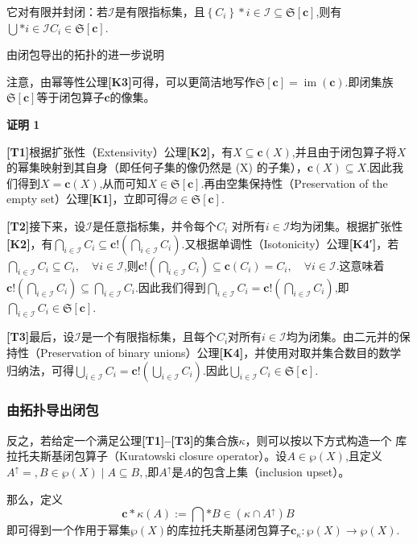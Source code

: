 它对有限并封闭：若$\mathcal{I}$是有限指标集，且$\left\{ C_i \right\}*{i \in \mathcal{I}} \subseteq {\mathfrak{S}}[\mathbf{c}]$,则有$\bigcup*{i \in \mathcal{I}} C_i \in {\mathfrak{S}}[\mathbf{c}]$.

由闭包导出的拓扑的进一步说明

注意，由幂等性公理\textbf{[K3]}可得，可以更简洁地写作${\mathfrak{S}}[\mathbf{c}] = \operatorname{im}(\mathbf{c})$.即闭集族${\mathfrak{S}}[\mathbf{c}]$等于闭包算子$\mathbf{c}$的像集。

\textbf{证明 1}

\textbf{[T1]}根据扩张性（Extensivity）公理\textbf{[K2]}，有$X \subseteq \mathbf{c}(X)$,并且由于闭包算子将$X$的幂集映射到其自身（即任何子集的像仍然是 (X) 的子集），$\mathbf{c}(X) \subseteq X$.因此我们得到$X = \mathbf{c}(X)$,从而可知$X \in {\mathfrak{S}}[\mathbf{c}]$.再由空集保持性（Preservation of the empty set）公理\textbf{[K1]}，立即可得$\varnothing \in {\mathfrak{S}}[\mathbf{c}]$.

\textbf{[T2]}接下来，设$\mathcal{I}$是任意指标集，并令每个$C_i$ 对所有$i \in \mathcal{I}$均为闭集。根据扩张性\textbf{[K2]}，有$\bigcap_{i \in \mathcal{I}} C_i \subseteq \mathbf{c}!\left( \bigcap_{i \in \mathcal{I}} C_i \right)$.又根据单调性（Isotonicity）公理\textbf{[K4′]}，若$\bigcap_{i \in \mathcal{I}} C_i \subseteq C_i, \quad \forall i \in \mathcal{I}$,则$\mathbf{c}!\left( \bigcap_{i \in \mathcal{I}} C_i \right) \subseteq \mathbf{c}(C_i) = C_i, \quad \forall i \in \mathcal{I}$.这意味着$\mathbf{c}!\left( \bigcap_{i \in \mathcal{I}} C_i \right) \subseteq \bigcap_{i \in \mathcal{I}} C_i$.因此我们得到$\bigcap_{i \in \mathcal{I}} C_i = \mathbf{c}!\left( \bigcap_{i \in \mathcal{I}} C_i \right)$,即$\bigcap_{i \in \mathcal{I}} C_i \in {\mathfrak{S}}[\mathbf{c}]$.

\textbf{[T3]}最后，设$\mathcal{I}$是一个有限指标集，且每个$C_i$对所有$i \in \mathcal{I}$均为闭集。由二元并的保持性（Preservation of binary unions）公理\textbf{[K4]}，并使用对取并集合数目的数学归纳法，可得$\bigcup_{i \in \mathcal{I}} C_i = \mathbf{c}!\left( \bigcup_{i \in \mathcal{I}} C_i \right)$.因此$\bigcup_{i \in \mathcal{I}} C_i \in {\mathfrak{S}}[\mathbf{c}]$.
\subsubsection{由拓扑导出闭包}
反之，若给定一个满足公理\textbf{[T1]–[T3]}的集合族$\kappa$，则可以按以下方式构造一个 库拉托夫斯基闭包算子（Kuratowski closure operator）。设$A \in \wp(X)$,且定义$A^{\uparrow} = {, B \in \wp(X) \mid A \subseteq B ,}$,即$A^{\uparrow}$是$A$的包含上集（inclusion upset）。

那么，定义
$$
\mathbf{c}*{\kappa}(A) := \bigcap*{B \in (\kappa \cap A^{\uparrow})} B~
$$
即可得到一个作用于幂集$\wp(X)$的库拉托夫斯基闭包算子$\mathbf{c}_{\kappa} : \wp(X) \to \wp(X)$.

